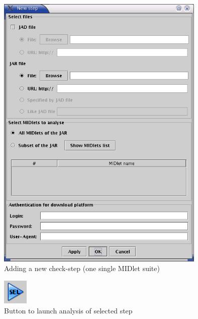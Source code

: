  \begin{figure}[h]
 \begin{center}
 \includegraphics[width=10cm]{figures/GUI-new-step-dialog}
 \end{center}
 \caption{Adding a new check-step (one single MIDlet suite)}
 \label{figAddingMIDletSuite}
 \end{figure} 

 \begin{figure}[h]
 \begin{center}
 \includegraphics[width=1.2cm]{figures/buttonAnalyseSelection}
 \end{center}
 \caption{Button to launch analysis of selected step}
 \label{figButAnalyse}
 \end{figure}

